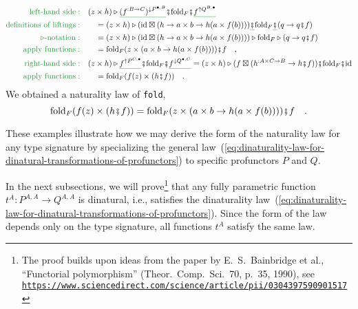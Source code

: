 \begin{align*}
{\color{greenunder}\text{left-hand side}:}\quad & (z\times h)\triangleright\gunderline{(f^{:B\rightarrow C})^{\downarrow P^{\bullet,B}}}\bef\text{fold}_{F}\bef\gunderline{f^{\uparrow Q^{B,\bullet}}}\\
{\color{greenunder}\text{definitions of liftings}:}\quad & \quad=(z\times h)\triangleright(\text{id}\boxtimes(h\rightarrow a\times b\rightarrow h(a\times f(b))))\gunderline{\bef}\text{fold}_{F}\gunderline{\bef}(q\rightarrow q\bef f)\\
{\color{greenunder}\triangleright\text{-notation}:}\quad & \quad=(z\times h)\triangleright(\text{id}\boxtimes(h\rightarrow a\times b\rightarrow h(a\times f(b))))\triangleright\text{fold}_{F}\triangleright(q\rightarrow q\bef f)\\
{\color{greenunder}\text{apply functions}:}\quad & \quad=\text{fold}_{F}(z\times(a\times b\rightarrow h(a\times f(b))))\bef f\quad,\\
{\color{greenunder}\text{right-hand side}:}\quad & (z\times h)\triangleright\gunderline{f^{\uparrow P^{C,\bullet}}}\bef\text{fold}_{F}\bef\gunderline{f^{\downarrow Q^{\bullet,C}}}=(z\times h)\triangleright(f\boxtimes(h^{:A\times C\rightarrow B}\rightarrow h\bef f))\bef\text{fold}_{F}\bef\text{id}\\
{\color{greenunder}\text{apply functions}:}\quad & \quad=\text{fold}_{F}(f(z)\times(h\bef f))\quad.
\end{align*}
We obtained a naturality law of \lstinline!fold!,
\[
\text{fold}_{F}(f(z)\times(h\bef f))=\text{fold}_{F}(z\times(a\times b\rightarrow h(a\times f(b))))\bef f\quad.
\]

These examples illustrate how we may derive the form of the naturality
law for any type signature by specializing the general law~(\ref{eq:dinaturality-law-for-dinatural-transformations-of-profunctors})
to specific profunctors $P$ and $Q$.

In the next subsections, we will prove\footnote{The proof builds upon ideas from the paper by E.~S.~Bainbridge et
al., \textsf{``}Functorial polymorphism\textsf{''} (Theor.~Comp.~Sci.~70, p.~35,
1990), see \texttt{\href{https://www.sciencedirect.com/science/article/pii/0304397590901517}{https://www.sciencedirect.com/science/article/pii/0304397590901517}}} that any fully parametric function $t^{A}:P^{A,A}\rightarrow Q^{A,A}$
is dinatural, i.e., satisfies the dinaturality law~(\ref{eq:dinaturality-law-for-dinatural-transformations-of-profunctors}).
Since the form of the law depends only on the type signature, all
functions $t^{A}$ satisfy the same law.

